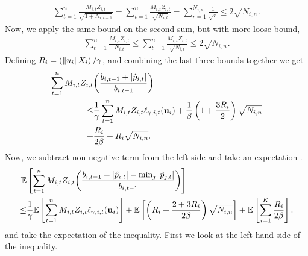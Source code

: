 \begin{equation*}
\begin{split}
\sum_{t=1}^{n}{\frac{M_{i,t}Z_{i,t}}{\sqrt{1+N_{i,t-1}}}}
=\sum_{t=1}^{n}{\frac{M_{i,t}Z_{i,t}}{\sqrt{N_{i,t}}}}
=\sum_{r=1}^{N_{i,n}}{\frac{1}{\sqrt{r}}} 
\le 2\sqrt{N_{i,n}}.
\end{split}
\end{equation*}
Now, we apply the same bound on the second sum, but with more loose bound, \begin{equation*}
\begin{split}
\sum_{t=1}^{n}{\frac{M_{i,t}Z_{i,t}}{N_{i,t}}}
\le\sum_{t=1}^{n}{\frac{M_{i,t}Z_{i,t}}{\sqrt{N_{i,t}}}} 
\le 2\sqrt{N_{i,n}}. 
\end{split}
\end{equation*}
Defining $R_i=\left({\Vert u_i\Vert X_i}\right)/{\gamma}$, and combining the last three bounds together we get
\begin{equation*}
\begin{split}
\sum_{t=1}^{n}M_{i,t}Z_{i,t}&{\left({\frac{b_{i,t-1} +\left\vert{\hat{p}_{i,t}}\right\vert}{b_{i,t-1}}}\right)}\\
\le &\frac{1}{\gamma}\sum_{t=1}^{n}{M_{i,t}Z_{i,t}}\ell_{\gamma,i,t}(\mathbf{u}_i)
+\frac{1}{\beta}\left({1+\frac{3R_{i}}{2}}\right)\sqrt{N_{i,n}}
\\
+&\frac{R_i}{2\beta}+R_{i}\sqrt{N_{i,n}}.
\end{split}
\end{equation*}
Now, we subtract non negative term from the left side and take an  expectation .
\begin{equation*}
\begin{split}  
\mathbb{E}&\left[{\sum_{t=1}^{n}M_{i,t}Z_{i,t}{\left({\frac{b_{i,t-1} +\left\vert{\hat{p}_{i,t}}\right\vert-\min_j\left\vert{\hat{p}_{j,t}}\right\vert}{b_{i,t-1}}}\right)}}\right]\\
\le &\frac{1}{\gamma}\mathbb{E}\left[{\sum_{t=1}^{n}{M_{i,t}Z_{i,t}}\ell_{\gamma,i,t}(\mathbf{u}_i)}\right]
+\mathbb{E}\left[{\left({R_{i}+\frac{2+3R_{i}}{2\beta}}\right)\sqrt{N_{i,n}}}\right]
+\mathbb{E}\left[{\sum_{i=1}^{K}\frac{R_i}{2\beta}}\right].
\end{split}
\end{equation*}
and take the expectation of the inequality. First we look at the left hand side of the inequality.

